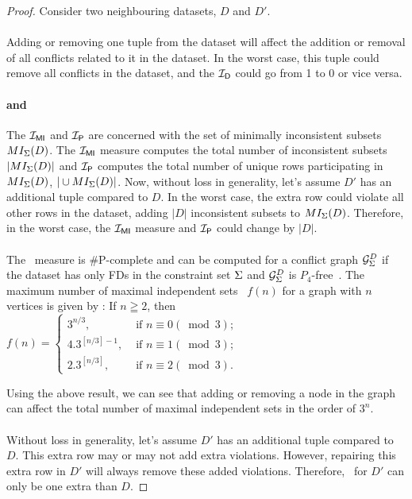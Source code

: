 \begin{proof}
Consider two neighbouring datasets, $D$ and $D'$.
\paragraph{\drastic}
Adding or removing one tuple from the dataset will affect the addition or removal of all conflicts related to it in the dataset. In the worst case, this tuple could remove all conflicts in the dataset, and the $\mathcal{I_\mathsf{D}}$ could go from 1 to 0 or vice versa.
\paragraph{\mininconsistency and \problematic}
The $\mathcal{I_{\mathsf{MI}}}$ and $\mathcal{I_\mathsf{P}}$ are concerned with the set of minimally inconsistent subsets $MI_{{\Sigma}}(D)$. The $\mathcal{I_{\mathsf{MI}}}$ measure computes the total number of inconsistent subsets $|MI_{{\Sigma}}(D)|$ and $\mathcal{I_\mathsf{P}}$ computes the total number of unique rows participating in $MI_{{\Sigma}}(D)$, $|\cup MI_{{\Sigma}}(D)|$. Now, without loss in generality, let's assume $D'$ has an additional tuple compared to $D$. In the worst case, the extra row could violate all other rows in the dataset, adding $|D|$ inconsistent subsets to $MI_{{\Sigma}}(D)$. Therefore, in the worst case, the $\mathcal{I_{\mathsf{MI}}}$ measure and $\mathcal{I_\mathsf{P}}$ could change by $|D|$.
\paragraph{\maxconsistency}
The \maxconsistency\ measure is \#P-complete and can be computed for a conflict graph ${\mathcal{G}_{{\Sigma}}^{D}}$ if the dataset has only FDs in the constraint set ${\Sigma}$ and ${\mathcal{G}_{{\Sigma}}^{D}}$ is $P_4$-free~\cite{KimelfeldLP20}. The maximum number of maximal independent sets~\cite{moon1965cliques, GriggsGG88} $f(n)$ for a graph with $n$ vertices is given by :  If $n \geqq 2$, then $f(n)= \begin{cases}3^{n / 3}, & \text { if } n \equiv 0(\bmod 3) \text {; } \\ 4.3^{[n / 3]-1}, & \text { if } n \equiv 1(\bmod 3) \text {; } \\ 2.3^{[n / 3]}, & \text { if } n \equiv 2(\bmod 3) .\end{cases}$

Using the above result, we can see that adding or removing a node in the graph can affect the total number of maximal independent sets in the order of $3^{n}$.
\paragraph{\repair}
Without loss in generality, let's assume $D'$ has an additional tuple compared to $D$. This extra row may or may not add extra violations. However, repairing this extra row in $D'$ will always remove these added violations. Therefore, \repair\ for $D'$ can only be one extra than $D$.
\end{proof} 

